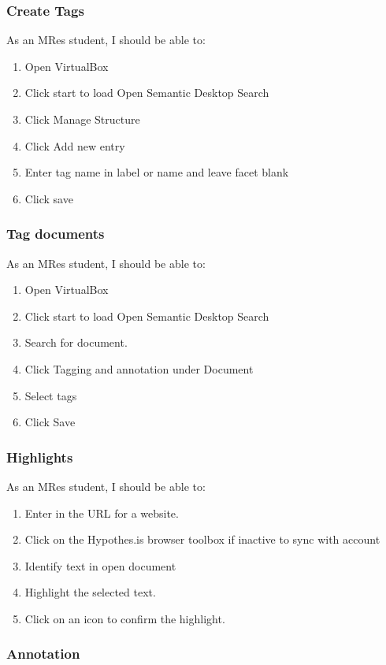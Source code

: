 \documentclass{article}
\begin{document}
\subsubsection*{Create Tags}

As an MRes student, I should be able to:
\begin{enumerate}
\item Open VirtualBox
\item Click start to load Open Semantic Desktop Search
\item Click Manage Structure
\item Click Add new entry
\item Enter tag name in label or name and leave facet blank
\item Click save
\end{enumerate}

\subsubsection*{Tag documents}

As an MRes student, I should be able to:
\begin{enumerate}
\item Open VirtualBox
\item Click start to load Open Semantic Desktop Search
\item Search for document.
\item Click Tagging and annotation under Document
\item Select tags
\item Click Save
\end{enumerate}

\subsubsection*{Highlights}

As an MRes student, I should be able to: \begin{enumerate}
\item Enter in the URL for a website.
\item Click on the Hypothes.is browser toolbox if inactive to sync with account
\item Identify text in open document
\item Highlight the selected text. 
\item Click on an icon to confirm the highlight.
\end{enumerate}

\subsubsection*{Annotation}
\end{document}
